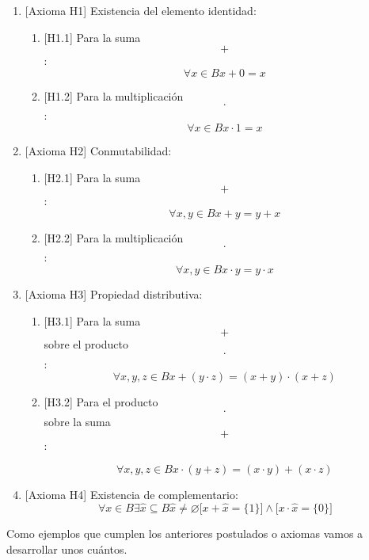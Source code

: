 \documentclass[
]{article}
\providecommand{\tightlist}{%
  \setlength{\itemsep}{0pt}\setlength{\parskip}{0pt}}
\begin{document}
\begin{enumerate}
\begin{enumerate}
    \begin{enumerate}
    \def\labelenumiii{\arabic{enumiii}.}
    \item
      {[}Axioma H1{]} Existencia del elemento identidad:

      \begin{enumerate}
      \def\labelenumiv{\arabic{enumiv}.}
      \tightlist
      \item
        {[}H1.1{]} Para la suma \[+\]: \[\forall{x \in B}{{x + 0} = x}\]
      \item
        {[}H1.2{]} Para la multiplicación \[\cdot\]:
        \[\forall{x \in B}{{x \cdot 1} = x}\]
      \end{enumerate}
    \item
      {[}Axioma H2{]} Conmutabilidad:

      \begin{enumerate}
      \def\labelenumiv{\arabic{enumiv}.}
      \tightlist
      \item
        {[}H2.1{]} Para la suma \[+\]:
        \[\forall x,{y \in B}{{x + y} = {y + x}}\]
      \item
        {[}H2.2{]} Para la multiplicación\[\cdot\]:
        \[\forall x,{y \in B}{{x \cdot y} = {y \cdot x}}\]
      \end{enumerate}
    \item
      {[}Axioma H3{]} Propiedad distributiva:

      \begin{enumerate}
      \def\labelenumiv{\arabic{enumiv}.}
      \item
        {[}H3.1{]} Para la suma \[+\] sobre el
        producto\[\cdot\]:\[\forall x,y,{z \in B}{{x + {({y \cdot z})}} = {{({x + y})} \cdot {({x + z})}}}\]
      \item
        {[}H3.2{]} Para el producto\[\cdot\]sobre la suma \[+\]:

        \[\forall x,y,{z \in B}{{x \cdot {({y + z})}} = {{({x \cdot y})} + {({x \cdot z})}}}\]
      \end{enumerate}
    \item
      {[}Axioma H4{]} Existencia de complementario:
      \[\forall{x \in B}\exists{\widehat{x} \subseteq B}{\widehat{x} \neq \varnothing}{{\lbrack{{x + \widehat{x}} = {\{ 1\}}}\rbrack} \land {\lbrack{{x \cdot \widehat{x}} = {\{ 0\}}}\rbrack}}\]
    \end{enumerate}
  \end{enumerate}

  Como ejemplos que cumplen los anteriores postulados o axiomas vamos a
  desarrollar unos cuántos.


\end{enumerate}
\end{document}
